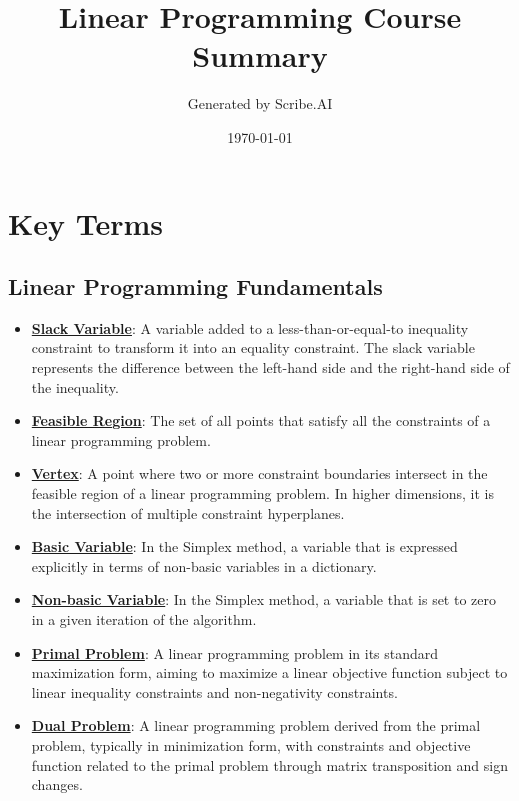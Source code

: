 \documentclass{article}%
\title{Linear Programming Course Summary}%
\author{Generated by Scribe.AI}%
\date{\today}%
\begin{document}
%
\normalsize%
\maketitle%
\section{Key Terms}%
\label{sec:KeyTerms}%
\subsection{Linear Programming Fundamentals}%
\label{subsec:LinearProgrammingFundamentals}%
\begin{itemize}[leftmargin=*]%
\item \href{https://www.math.purdue.edu/~yipn/421/2024-08-27-ExSimplex.pdf#page=1}{\textbf{Slack Variable}}: A variable added to a less-than-or-equal-to inequality constraint to transform it into an equality constraint. The slack variable represents the difference between the left-hand side and the right-hand side of the inequality.%
\item \href{https://www.math.purdue.edu/~yipn/421/2024-08-27-ExSimplex.pdf#page=4}{\textbf{Feasible Region}}: The set of all points that satisfy all the constraints of a linear programming problem.%
\item \href{https://www.math.purdue.edu/~yipn/421/2024-08-27-ExSimplex.pdf#page=5}{\textbf{Vertex}}: A point where two or more constraint boundaries intersect in the feasible region of a linear programming problem. In higher dimensions, it is the intersection of multiple constraint hyperplanes.%
\item \href{https://www.math.purdue.edu/~yipn/421/2024-08-27-ExSimplex.pdf#page=6}{\textbf{Basic Variable}}: In the Simplex method, a variable that is expressed explicitly in terms of non-basic variables in a dictionary.%
\item \href{https://www.math.purdue.edu/~yipn/421/2024-08-27-ExSimplex.pdf#page=6}{\textbf{Non-basic Variable}}: In the Simplex method, a variable that is set to zero in a given iteration of the algorithm.%
\item \href{https://www.math.purdue.edu/~yipn/421/2024-09-12-Duality.pdf#page=1}{\textbf{Primal Problem}}: A linear programming problem in its standard maximization form, aiming to maximize a linear objective function subject to linear inequality constraints and non-negativity constraints.%
\item \href{https://www.math.purdue.edu/~yipn/421/2024-09-12-Duality.pdf#page=1}{\textbf{Dual Problem}}: A linear programming problem derived from the primal problem, typically in minimization form, with constraints and objective function related to the primal problem through matrix transposition and sign changes.%

\end{itemize}
\end{document}
